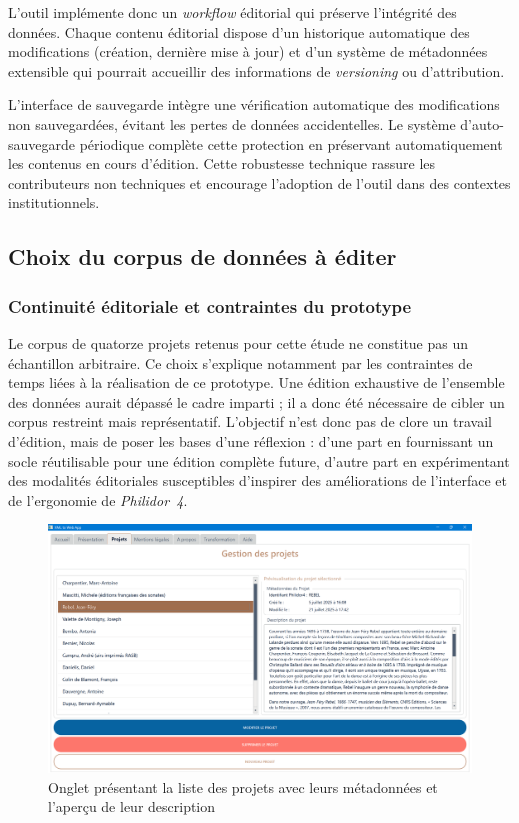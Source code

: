 L'outil implémente donc un \textit{\gls{workflow}} éditorial qui préserve l'intégrité des données. Chaque contenu éditorial dispose d'un historique automatique des modifications (création, dernière mise à jour) et d'un système de métadonnées extensible qui pourrait accueillir des informations de \textit{versioning} ou d'attribution.

L'interface de sauvegarde intègre une vérification automatique des modifications non sauvegardées, évitant les pertes de données accidentelles. Le système d'auto-sauvegarde périodique complète cette protection en préservant automatiquement les contenus en cours d'édition. Cette robustesse technique rassure les contributeurs non techniques et encourage l'adoption de l'outil dans des contextes institutionnels.

\subsection{Choix du corpus de données à éditer}

\subsubsection{Continuité éditoriale et contraintes du prototype}

Le corpus de quatorze projets retenus pour cette étude ne constitue pas un échantillon arbitraire. Ce choix s’explique notamment par les contraintes de temps liées à la réalisation de ce prototype. Une édition exhaustive de l’ensemble des données aurait dépassé le cadre imparti ; il a donc été nécessaire de cibler un corpus restreint mais représentatif. L’objectif n’est donc pas de clore un travail d’édition, mais de poser les bases d’une réflexion : d’une part en fournissant un socle réutilisable pour une édition complète future, d’autre part en expérimentant des modalités éditoriales susceptibles d’inspirer des améliorations de l’interface et de l’ergonomie de \textit{Philidor~4}.

\begin{figure}[h]
	\caption{Onglet présentant la liste des projets avec leurs métadonnées et l'aperçu de leur description} \label{appli-onglet-projets}
	\centering
	\includegraphics[width=\textwidth]{images/appli-onglet-projets.png}
\end{figure}

